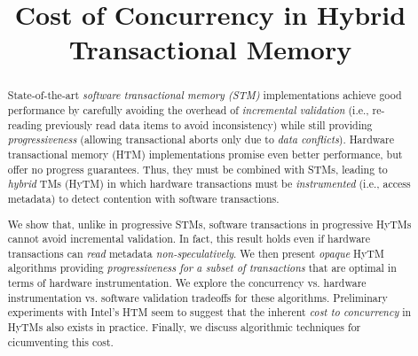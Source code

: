 \documentclass[11pt,pdftex,a4paper]{article}%
\begin{document}
\title{Cost of Concurrency in Hybrid Transactional Memory}
	   
\maketitle

\newcommand{\trevor}[1]{\textbf{[[#1--Trevor]]}}

%
\begin{abstract}
State-of-the-art \emph{software transactional memory (STM)} implementations achieve 
good performance by carefully avoiding the overhead of \emph{incremental validation} 
(i.e., re-reading previously read data items to avoid inconsistency) while
still providing \emph{progressiveness} (allowing transactional aborts only due to \emph{data conflicts}).
Hardware transactional memory (HTM) implementations promise even better performance, 
but offer no progress guarantees.
Thus, they must be combined with STMs, leading to \emph{hybrid} TMs (HyTM)
in which hardware transactions must be \emph{instrumented} (i.e., access metadata) 
to detect contention with software transactions. 

We show that, unlike in progressive STMs, software transactions in progressive HyTMs
cannot avoid incremental validation.
In fact, this result holds even if hardware transactions can \emph{read} metadata 
\emph{non-speculatively}. 
We then present \emph{opaque} HyTM algorithms providing \emph{progressiveness for a subset of transactions} 
that are  optimal in terms of hardware instrumentation. 
We explore the concurrency vs. hardware instrumentation vs. software validation
tradeoffs for these algorithms.
Preliminary experiments with Intel's HTM 
seem to suggest that the inherent \emph{cost to concurrency} 
in HyTMs also exists in practice. Finally, we discuss algorithmic techniques for cicumventing this cost.
\end{abstract}

\newpage
{}\setcounter{page}{1}


%

%

%

%

%


%
%
\newpage
%


\end{document}
